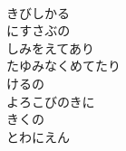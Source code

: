 \documentclass[10pt,b5j]{tarticle} %
\begin{document}
\begin{enumerate}
\begin{minipage}[c]{\blocksize}
        \vspace{\linespace}
        \item~\\
        きびしかる\\
        にすさぶの\\
        しみをえてあり\\
        たゆみなくめてたり\\
        けるの\\
        よろこびのきに\\
        きくの\\
        とわにえん
    
    \end{minipage}
\end{enumerate} %
\end{document}
